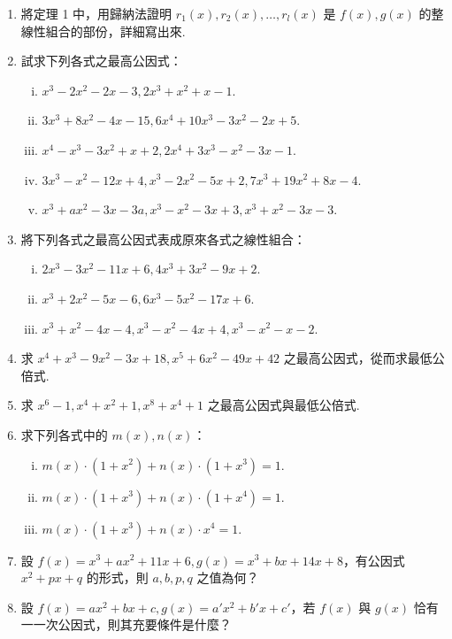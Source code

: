 \begin{enumerate}[1.]
  \item 將定理 1 中，用歸納法證明 $r_1(x), r_2(x), \dots, r_l(x)$ 是 $f(x), g(x)$ 的整線性組合的部份，詳細寫出來.

  \item 試求下列各式之最高公因式：
  \begin{enumerate}[(i)]
    \item $x^3-2x^2-2x-3, 2x^3+x^2+x-1$.
    \item $3x^3+8x^2-4x-15, 6x^4+10x^3-3x^2-2x+5$.
    \item $x^4-x^3-3x^2+x+2, 2x^4+3x^3-x^2-3x-1$.
    \item $3x^3-x^2-12x+4, x^3-2x^2-5x+2, 7x^3+19x^2+8x-4$.
    \item $x^3+ax^2-3x-3a, x^3-x^2-3x+3, x^3+x^2-3x-3$.
  \end{enumerate}

  \item 將下列各式之最高公因式表成原來各式之線性組合：
  \begin{enumerate}[(i)]
    \item $2x^3-3x^2-11x+6, 4x^3+3x^2-9x+2$.
    \item $x^3+2x^2-5x-6, 6x^3-5x^2-17x+6$.
    \item $x^3+x^2-4x-4, x^3-x^2-4x+4, x^3-x^2-x-2$.
  \end{enumerate}

  \item 求 $x^4+x^3-9x^2-3x+18, x^5+6x^2-49x+42$ 之最高公因式，從而求最低公倍式.

  \item 求 $x^6-1, x^4+x^2+1, x^8+x^4+1$ 之最高公因式與最低公倍式.

  \item 求下列各式中的 $m(x), n(x)$：
  \begin{enumerate}[(i)]
    \item $m(x) \cdot (1+x^2) + n(x) \cdot (1+x^3) = 1$.
    \item $m(x) \cdot (1+x^3) + n(x) \cdot (1+x^4) = 1$.
    \item $m(x) \cdot (1+x^3) + n(x) \cdot x^4 = 1$.
  \end{enumerate}

  \item 設 $f(x) = x^3+ax^2+11x+6, g(x) = x^3+bx+14x+8$，有公因式 $x^2+px+q$ 的形式，則 $a, b, p, q$ 之值為何？

  \item 設 $f(x) = ax^2+bx+c, g(x) = a'x^2+b'x+c'$，若 $f(x)$ 與 $g(x)$ 恰有一一次公因式，則其充要條件是什麼？
\end{enumerate}

